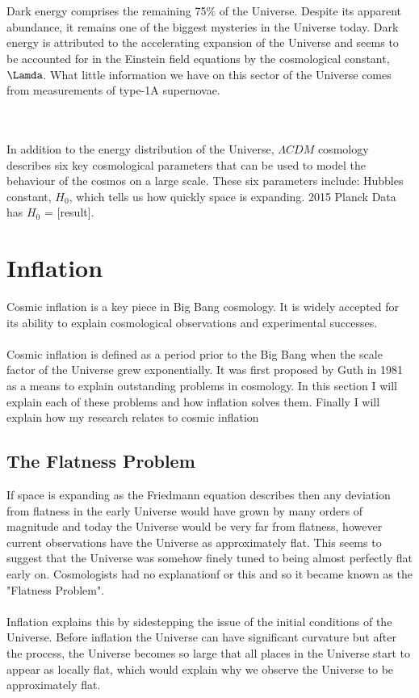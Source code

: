 \documentclass[12pt]{report}
\begin{document}
\begin{itemize}
\\\\Dark energy comprises the remaining 75$\%$ of the Universe. Despite its apparent abundance, it remains one of the biggest mysteries in the Universe today. Dark energy is attributed to the accelerating expansion of the Universe and seems to be accounted for in the Einstein field equations by the cosmological constant, $\Lamda$. What little information we have on this sector of the Universe comes from measurements of type-1A supernovae.

\\\\In addition to the energy distribution of the Universe, $\Lambda CDM$ cosmology describes six key cosmological parameters that can be used to model the behaviour of the cosmos on a large scale. These six parameters include: Hubbles constant, $H_0$, which tells us how quickly space is expanding. 2015 Planck Data has $H_0$ = [result].


\section{Inflation}
Cosmic inflation is a key piece in Big Bang cosmology. It is widely accepted for its ability to explain cosmological observations and experimental successes.
\\\\
Cosmic inflation is defined as a period prior to the Big Bang when the scale factor of the Universe grew exponentially. It was first proposed by Guth in 1981 as a means to explain outstanding problems in cosmology. In this section I will explain each of these problems and how inflation solves them. Finally I will explain how my research relates to cosmic inflation

\subsection{The Flatness Problem}
If space is expanding as the Friedmann equation describes then any deviation from flatness in the early Universe would have grown by many orders of magnitude and today the Universe would be very far from flatness, however current observations have the Universe as approximately flat. This seems to suggest that the Universe was somehow finely tuned to being almost perfectly flat early on. Cosmologists had no explanationf or this and so it became known as the "Flatness Problem".
\\\\
Inflation explains this by sidestepping the issue of the initial conditions of the Universe. Before inflation the Universe can have significant curvature but after the process, the Universe becomes so large that all places in the Universe start to appear as locally flat, which would explain why we observe the Universe to be approximately flat.


\end{itemize}
\end{document}
